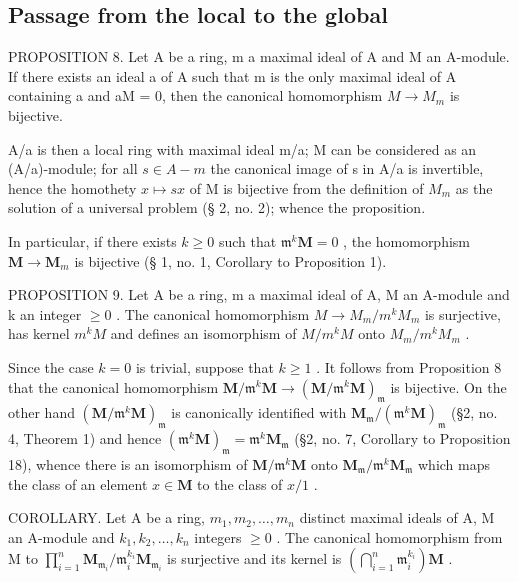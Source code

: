 \subsection{Passage from the local to the global}

PROPOSITION 8. Let A be a ring, m a maximal ideal of A and M an A-module. If there exists an ideal a of A such that m is the only maximal ideal of A containing a and aM = 0, then the canonical homomorphism \(M \rightarrow M_{m}\) is bijective.

A/a is then a local ring with maximal ideal m/a; M can be considered as an (A/a)-module; for all \(s \in A - m\) the canonical image of s in A/a is invertible, hence the homothety \(x \mapsto sx\) of M is bijective from the definition of \(M_{m}\) as the solution of a universal problem (§ 2, no. 2); whence the proposition.

In particular, if there exists \(k \geqslant 0\) such that \(\mathfrak{m}^k\mathbf{M} = 0\) , the homomorphism \(\mathbf{M} \to \mathbf{M}_m\) is bijective (§ 1, no. 1, Corollary to Proposition 1).

PROPOSITION 9. Let A be a ring, m a maximal ideal of A, M an A-module and k an integer \(\geqslant0\) . The canonical homomorphism \(M\to M_{m}/m^{k}M_{m}\) is surjective, has kernel \(m^{k}M\) and defines an isomorphism of \(M/m^{k}M\) onto \(M_{m}/m^{k}M_{m}\) .

Since the case \(k=0\) is trivial, suppose that \(k\geqslant1\) . It follows from Proposition 8 that the canonical homomorphism \(\mathbf{M}/\mathfrak{m}^{k}\mathbf{M}\to(\mathbf{M}/\mathfrak{m}^{k}\mathbf{M})_{\mathfrak{m}}\) is bijective. On the other hand \((\mathbf{M}/\mathfrak{m}^{k}\mathbf{M})_{\mathfrak{m}}\) is canonically identified with \(\mathbf{M}_{\mathfrak{m}}/(\mathfrak{m}^{k}\mathbf{M})_{\mathfrak{m}}\) (§2, no. 4, Theorem 1) and hence \((\mathfrak{m}^{k}\mathbf{M})_{\mathfrak{m}}=\mathfrak{m}^{k}\mathbf{M}_{\mathfrak{m}}\) (§2, no. 7, Corollary to Proposition 18), whence there is an isomorphism of \(\mathbf{M}/\mathfrak{m}^{k}\mathbf{M}\) onto \(\mathbf{M}_{\mathfrak{m}}/\mathfrak{m}^{k}\mathbf{M}_{\mathfrak{m}}\) which maps the class of an element \(x\in\mathbf{M}\) to the class of \(x/1\) .

COROLLARY. Let A be a ring, \(m_{1}, m_{2}, \ldots, m_{n}\) distinct maximal ideals of A, M an A-module and \(k_{1}, k_{2}, \ldots, k_{n}\) integers \(\geqslant 0\) . The canonical homomorphism from M to \(\prod_{i=1}^{n} \mathbf{M}_{\mathfrak{m}_{i}}/\mathfrak{m}_{i}^{k_{i}} \mathbf{M}_{\mathfrak{m}_{i}}\) is surjective and its kernel is \(\left(\bigcap_{i=1}^{n} \mathfrak{m}_{i}^{k_{i}}\right) \mathbf{M}\) .

